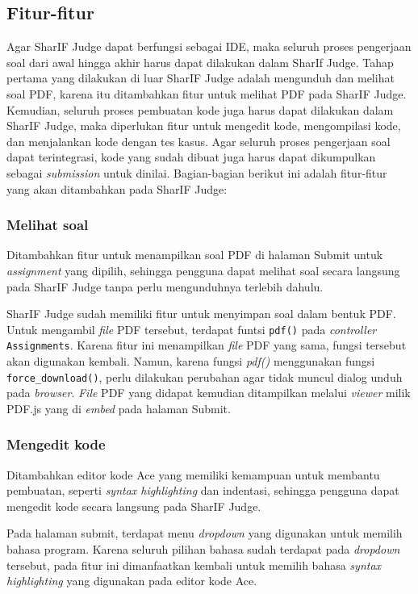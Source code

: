 \subsection{Fitur-fitur}

Agar SharIF Judge dapat berfungsi sebagai IDE, maka seluruh proses pengerjaan soal dari awal hingga akhir harus dapat dilakukan dalam SharIf Judge. Tahap pertama yang dilakukan di luar SharIF Judge adalah mengunduh dan melihat soal PDF, karena itu ditambahkan fitur untuk melihat PDF pada SharIF Judge. Kemudian, seluruh proses pembuatan kode juga harus dapat dilakukan dalam SharIF Judge, maka diperlukan fitur untuk mengedit kode, mengompilasi kode, dan menjalankan kode dengan tes kasus. Agar seluruh proses pengerjaan soal dapat terintegrasi, kode yang sudah dibuat juga harus dapat dikumpulkan sebagai \textit{submission} untuk dinilai. Bagian-bagian berikut ini adalah fitur-fitur yang akan ditambahkan pada SharIF Judge:


\subsubsection{Melihat soal}
Ditambahkan fitur untuk menampilkan soal PDF di halaman Submit untuk \textit{assignment} yang dipilih, sehingga pengguna dapat melihat soal secara langsung pada SharIF Judge tanpa perlu mengunduhnya terlebih dahulu. 

SharIF Judge sudah memiliki fitur untuk menyimpan soal dalam bentuk PDF. Untuk mengambil \textit{file} PDF tersebut, terdapat funtsi \verb|pdf()| pada \textit{controller} \texttt{Assignments}. Karena fitur ini menampilkan \textit{file} PDF yang sama, fungsi tersebut akan digunakan kembali. Namun, karena fungsi \textit{pdf()} menggunakan fungsi \verb|force_download()|, perlu dilakukan perubahan agar tidak muncul dialog unduh pada \textit{browser}. \textit{File} PDF yang didapat kemudian ditampilkan melalui \textit{viewer} milik PDF.js yang di \textit{embed} pada halaman Submit. 
        
\subsubsection{Mengedit kode} 
Ditambahkan editor kode Ace yang memiliki kemampuan untuk membantu pembuatan, seperti \textit{syntax highlighting} dan indentasi, sehingga pengguna dapat mengedit kode secara langsung pada SharIF Judge. 

Pada halaman submit, terdapat menu \textit{dropdown} yang digunakan untuk memilih bahasa program. Karena seluruh pilihan bahasa sudah terdapat pada \textit{dropdown} tersebut, pada fitur ini dimanfaatkan kembali untuk memilih bahasa \textit{syntax highlighting} yang digunakan pada editor kode Ace.
        

